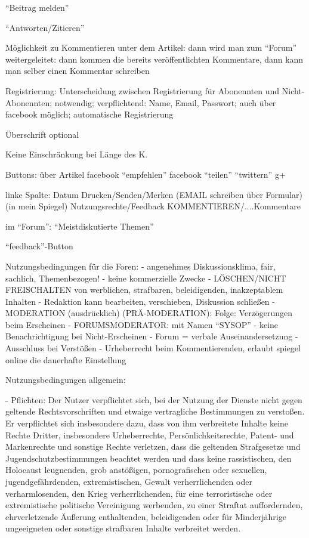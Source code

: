 ``Beitrag melden''

``Antworten/Zitieren''

Möglichkeit zu Kommentieren unter dem Artikel: dann wird man zum ``Forum'' weitergeleitet: dann kommen die bereits veröffentlichten Kommentare, dann kann man selber einen Kommentar schreiben

Registrierung: Unterscheidung zwischen Registrierung für Abonennten und Nicht-Abonennten; notwendig; verpflichtend: Name, Email, Passwort; auch über facebook möglich; automatische Registrierung

Überschrift optional

Keine Einschränkung bei Länge des K.

Buttons: über Artikel
	facebook ``empfehlen''
	facebook ``teilen''
	``twittern''
	g+
	
linke Spalte: 
	Datum
	Drucken/Senden/Merken (EMAIL schreiben über Formular) (in mein Spiegel)
	Nutzungsrechte/Feedback
	KOMMENTIEREN/....Kommentare


	
im ``Forum'': ``Meistdiskutierte Themen''

``feedback''-Button

Nutzungsbedingungen für die Foren:
- angenehmes Diskussionsklima, fair, sachlich, Themenbezogen!
- keine kommerzielle Zwecke
- LÖSCHEN/NICHT FREISCHALTEN von werblichen, strafbaren, beleidigenden, inakzeptablem Inhalten
- Redaktion kann bearbeiten, verschieben, Diskussion schließen
- MODERATION (ausdrücklich) (PRÄ-MODERATION): Folge: Verzögerungen beim Erscheinen 
- FORUMSMODERATOR: mit Namen ``SYSOP'' 
- keine Benachrichtigung bei Nicht-Erscheinen
- Forum = verbale Auseinandersetzung
- Ausschluss bei Verstößen
- Urheberrecht beim Kommentierenden, erlaubt spiegel online die dauerhafte Einstellung



Nutzungsbedingungen allgemein:

- Pflichten: Der Nutzer verpflichtet sich, bei der Nutzung der Dienste nicht gegen geltende Rechtsvorschriften und etwaige vertragliche Bestimmungen zu verstoßen. Er verpflichtet sich insbesondere dazu, dass von ihm verbreitete Inhalte keine Rechte Dritter, insbesondere Urheberrechte, Persönlichkeitsrechte, Patent- und Markenrechte und sonstige Rechte verletzen, dass die geltenden Strafgesetze und Jugendschutzbestimmungen beachtet werden und dass keine rassistischen, den Holocaust leugnenden, grob anstößigen, pornografischen oder sexuellen, jugendgefährdenden, extremistischen, Gewalt verherrlichenden oder verharmlosenden, den Krieg verherrlichenden, für eine terroristische oder extremistische politische Vereinigung werbenden, zu einer Straftat auffordernden, ehrverletzende Äußerung enthaltenden, beleidigenden oder für Minderjährige ungeeigneten oder sonstige strafbaren Inhalte verbreitet werden.

